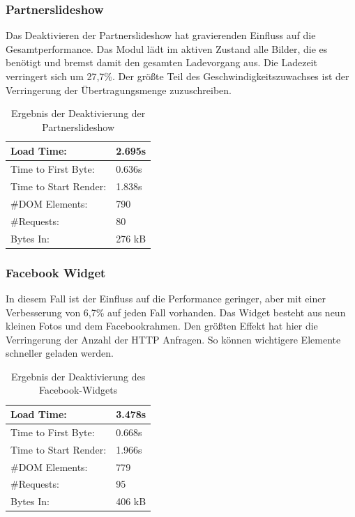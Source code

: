 \subsubsection{Partnerslideshow} Das Deaktivieren der Partnerslideshow hat gravierenden Einfluss auf die Gesamtperformance. Das Modul lädt im aktiven Zustand alle Bilder, die es benötigt und bremst damit den gesamten Ladevorgang aus. Die Ladezeit verringert sich um 27,7\%. Der größte Teil des Geschwindigkeitszuwachses ist der Verringerung der Übertragungsmenge zuzuschreiben. 

\begin{table}[!ht]
\centering
\caption{Ergebnis der Deaktivierung der Partnerslideshow}
    \begin{tabular}{ | p{3cm} | p{1.5cm} | }
    \hline
    Load Time: 			& 2.695s 	\\ \hline
    Time to First Byte:		& 0.636s  	\\ \hline
    Time to Start Render:	& 1.838s	\\ \hline
    \#DOM Elements:		& 790 		\\ \hline
    \#Requests:			& 80 		\\ \hline
    Bytes In:			& 276 kB 	\\ \hline
    \hline
    \end{tabular}
\end{table}

\subsubsection{Facebook Widget} In diesem Fall ist der Einfluss auf die Performance geringer, aber mit einer Verbesserung von 6,7\% auf jeden Fall vorhanden. Das Widget besteht aus neun kleinen Fotos und dem Facebookrahmen. Den größten Effekt hat hier die Verringerung der Anzahl der HTTP Anfragen. So können wichtigere Elemente schneller geladen werden.

\begin{table}[!ht]
\centering
\caption{Ergebnis der Deaktivierung des Facebook-Widgets}
    \begin{tabular}{ | p{3cm} | p{1.5cm} | }
    \hline
    Load Time: 			& 3.478s 	\\ \hline
    Time to First Byte:		& 0.668s  	\\ \hline
    Time to Start Render:	& 1.966s	\\ \hline
    \#DOM Elements:		& 779 		\\ \hline
    \#Requests:			& 95 		\\ \hline
    Bytes In:			& 406 kB 	\\ \hline
    \hline
    \end{tabular}
\end{table}

